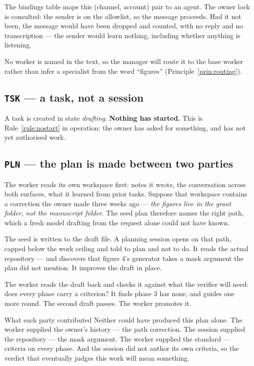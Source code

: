 \documentclass[11pt]{article}
\newcommand{\code}[1]{\texttt{\small #1}}
\begin{document}
The bindings table maps this (channel, account) pair to an agent. The owner lock is consulted: the sender is on the allowlist, so the message proceeds. Had it not been, the message would have been dropped and counted, with no reply and no transcription --- the sender would learn nothing, including whether anything is listening.

No worker is named in the text, so the manager will route it to the base worker rather than infer a specialist from the word ``figures'' (Principle~\ref{prin:routing}).

\subsection{\code{TSK} --- a task, not a session}

A task is created in state \emph{drafting}. \textbf{Nothing has started.} This is Rule~\ref{rule:nostart} in operation: the owner has asked for something, and has not yet authorised work.

\subsection{\code{PLN} --- the plan is made between two parties}

The worker reads its own workspace first: notes it wrote, the conversation across both surfaces, what it learned from prior tasks. Suppose that workspace contains a correction the owner made three weeks ago --- \emph{the figures live in the grant folder, not the manuscript folder}. The seed plan therefore names the right path, which a fresh model drafting from the request alone could not have known.

The seed is written to the draft file. A planning session opens on that path, capped below the work ceiling and told to plan and not to do. It reads the actual repository --- and discovers that figure 4's generator takes a mask argument the plan did not mention. It improves the draft in place.

The worker reads the draft back and checks it against what the verifier will need: does every phase carry a criterion? It finds phase 3 has none, and guides one more round. The second draft passes. The worker promotes it.

\begin{notebox}{What each party contributed}
Neither could have produced this plan alone. The worker supplied the owner's history --- the path correction. The session supplied the repository --- the mask argument. The worker supplied the standard --- criteria on every phase. And the session did not author its own criteria, so the verdict that eventually judges this work will mean something.
\end{notebox}
\end{document}
